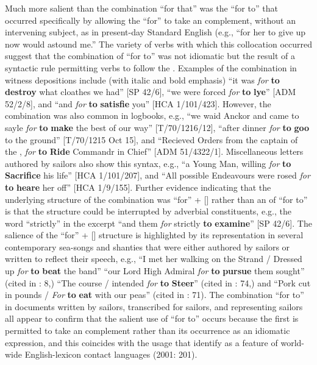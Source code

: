 Much more salient than the combination “for that” was the  “for to” that occurred specifically by allowing the  “for” to take an   complement, without an intervening subject, as in present-day Standard English (e.g., “for her to give up now would astound me.” The variety of verbs with which this collocation occurred suggest that the combination of “for to” was not idiomatic but the result of a syntactic rule permitting  verbs to follow the . Examples of the combination in witness depositions include (with italic and bold emphasis) “it was \textit{for} \textbf{to} \textbf{destroy} what cloathes we had” [SP 42/6], “we were forced \textit{for} \textbf{to} \textbf{lye}” [ADM 52/2/8], and “and \textit{for} \textbf{to} \textbf{satisfie} you” [HCA 1/101/423]. However, the combination was also common in logbooks, e.g., “we waid Anckor and came to sayle \textit{for} \textbf{to} \textbf{make} the best of our way” [T/70/1216/12], “after dinner \textit{for} \textbf{to} \textbf{goo} to the ground” [T/70/1215 Oct 15], and “Recieved Orders from the captain of the , \textit{for} \textbf{to} \textbf{Ride} Commandr in Chief” [ADM 51/4322/1]. Miscellaneous letters authored by sailors also show this syntax, e.g., “a Young Man, willing \textit{for} \textbf{to} \textbf{Sacrifice} his life” [HCA 1/101/207], and “All possible Endeavours were rosed \textit{for} \textbf{to} \textbf{heare} her off” [HCA 1/9/155]. Further evidence indicating that the underlying structure of the combination was “for” + [] rather than an  of “for to” is that the structure could be interrupted by adverbial constituents, e.g., the word “strictly” in the excerpt “and them \textit{for} strictly \textbf{to} \textbf{examine}” [SP 42/6]. The salience of the “for” + [] structure is highlighted by its representation in several contemporary sea-songs and shanties that were either authored by sailors or written to reflect their speech, e.g., “I met her walking on the Strand / Dressed up \textit{for} \textbf{to} \textbf{beat} the band” \citep[51,]{Hugill1969} “our Lord High Admiral \textit{for} \textbf{to} \textbf{pursue} them sought” (cited in \citealt{Palmer1986}: 8,) “The course / intended \textit{for} \textbf{to} \textbf{Steer}” (cited in \citealt{Palmer1986}: 74,) and “Pork cut in pounds / \textit{For} \textbf{to} \textbf{eat} with our peas” (cited in \citealt{Palmer1986}: 71). The combination “for to” in documents written by sailors, transcribed for sailors, and representing sailors all appear to confirm that the salient use of “for to” occurs because the first  is permitted to take an  complement rather than its occurrence as an idiomatic expression, and this coincides with the usage that \citeauthor{BakerHuber2001} identify as a feature of world-wide English-lexicon contact languages (2001: 201). 


